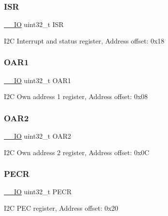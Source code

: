 \subsubsection{\texorpdfstring{I\+SR}{ISR}}
{\footnotesize\ttfamily \hyperlink{core__sc300_8h_aec43007d9998a0a0e01faede4133d6be}{\+\_\+\+\_\+\+IO} uint32\+\_\+t I\+SR}

I2C Interrupt and status register, Address offset\+: 0x18 \mbox{\label{struct_i2_c___type_def_a08b4be0d626a00f26bc295b379b3bba6}} 
\subsubsection{\texorpdfstring{O\+A\+R1}{OAR1}}
{\footnotesize\ttfamily \hyperlink{core__sc300_8h_aec43007d9998a0a0e01faede4133d6be}{\+\_\+\+\_\+\+IO} uint32\+\_\+t O\+A\+R1}

I2C Own address 1 register, Address offset\+: 0x08 \mbox{\label{struct_i2_c___type_def_ab5c57ffed0351fa064038939a6c0bbf6}} 
\subsubsection{\texorpdfstring{O\+A\+R2}{OAR2}}
{\footnotesize\ttfamily \hyperlink{core__sc300_8h_aec43007d9998a0a0e01faede4133d6be}{\+\_\+\+\_\+\+IO} uint32\+\_\+t O\+A\+R2}

I2C Own address 2 register, Address offset\+: 0x0C \mbox{\label{struct_i2_c___type_def_af427631ab4515bb1f16bf5869682c18b}} 
\subsubsection{\texorpdfstring{P\+E\+CR}{PECR}}
{\footnotesize\ttfamily \hyperlink{core__sc300_8h_aec43007d9998a0a0e01faede4133d6be}{\+\_\+\+\_\+\+IO} uint32\+\_\+t P\+E\+CR}

I2C P\+EC register, Address offset\+: 0x20 \mbox{\label{struct_i2_c___type_def_a9bf29a9104cb5569823ab892174f9c8c}} 
